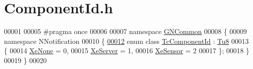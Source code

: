 \hypertarget{_component_id_8h_source}{}\section{Component\+Id.\+h}
\label{_component_id_8h_source}

\begin{DoxyCode}
00001 
00005 \textcolor{preprocessor}{#pragma once}
00006 
00007 \textcolor{keyword}{namespace }\mbox{\hyperlink{namespace_g_n_common}{GNCommon}}
00008 \{
00009    \textcolor{keyword}{namespace }NNotification
00010    \{
\mbox{\hyperlink{namespace_g_n_common_1_1_n_notification_ab468f440599e6d5a51d887dfa55b06b3}{00012}}       \textcolor{keyword}{enum class} \mbox{\hyperlink{namespace_g_n_common_1_1_n_notification_ab468f440599e6d5a51d887dfa55b06b3}{TcComponentId}} : \mbox{\hyperlink{namespace_g_n_common_a7939e251ddbf5d3a31832dcfdc8bde39}{Tu8}}
00013       \{
00014          \mbox{\hyperlink{namespace_g_n_common_1_1_n_notification_ab468f440599e6d5a51d887dfa55b06b3ab1dd4ba140ef44b2b6e425a90b4d11ba}{XeNone}}   = 0, 
00015          \mbox{\hyperlink{namespace_g_n_common_1_1_n_notification_ab468f440599e6d5a51d887dfa55b06b3ab55b8d4cd5d9df32ff6504e150b4a53d}{XeServer}} = 1, 
00016          \mbox{\hyperlink{namespace_g_n_common_1_1_n_notification_ab468f440599e6d5a51d887dfa55b06b3abf624c277a4697a96af203c9507ea0e6}{XeSensor}} = 2  
00017       \};
00018    \}
00019 \}
00020 
\end{DoxyCode}
